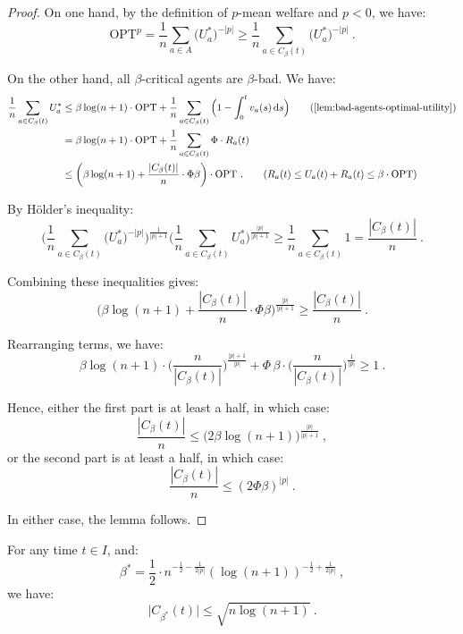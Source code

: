 \documentclass[11pt,letterpaper]{article}
\newcommand{\OPT}{\mathrm{OPT}}
\newcommand{\dif}[1]{\,\text{\rm d} #1}
\newcommand{\utility}{U}
\newcommand{\regularizer}{R}
\begin{document}
\begin{proof}    
	On one hand, by the definition of $p$-mean welfare and $p < 0$, we have:
	\[
		\OPT^p = \frac{1}{n} \sum_{a\in A} \big(\utility_a^*\big)^{-|p|} \ge \frac{1}{n} \sum_{a \in C_\beta(t)} \big(\utility_a^*\big)^{-|p|}
		~.
	\]
	
	On the other hand, all $\beta$-critical agents are $\beta$-bad.
	We have:
	\begin{align*}
		\frac{1}{n} \sum_{a \in C_\beta(t)} \utility_a^*
		&
		\leq \beta \log (n+1) \cdot \OPT + \frac{1}{n} \sum_{a \in C_\beta(t)} \Big( 1 - \int_0^t v_a(s) \dif{s} \Big)
		\tag{\Cref{lem:bad-agents-optimal-utility}} \\
		&
		= \beta \log (n+1) \cdot \OPT + \frac{1}{n} \sum_{a \in C_\beta(t)} \Phi \cdot \regularizer_a(t) \\
		&
		\le \bigg(\beta \log (n+1) + \frac{|C_\beta(t)|}{n} \cdot \Phi \beta \bigg) \cdot \OPT
		~.
		\tag{$\regularizer_a(t) \le \utility_a(t) + \regularizer_a(t) \le \beta \cdot \OPT$}
	\end{align*}
	
	By H\"{o}lder's inequality:
	\[
		\bigg( \frac{1}{n} \sum_{a \in C_\beta(t)} \big(\utility_a^*\big)^{-|p|} \bigg)^{\frac{1}{|p|+1}} \bigg( \frac{1}{n} \sum_{a \in C_\beta(t)} \utility_a^* \bigg)^{\frac{|p|}{|p|+1}} \ge \frac{1}{n} \sum_{a \in C_\beta(t)} 1 = \frac{|C_\beta(t)|}{n}
		~.
	\]
	
	Combining these inequalities gives:
	\[
		\bigg( \beta \log (n+1) + \frac{|C_\beta(t)|}{n} \cdot \Phi \beta \bigg)^{\frac{|p|}{|p|+1}} \ge \frac{|C_\beta(t)|}{n}
		~.
	\]
	
	Rearranging terms, we have:
	\[
		\beta \log (n+1) \cdot \bigg( \frac{n}{|C_\beta(t)|} \bigg)^{\frac{|p|+1}{|p|}} + \Phi\, \beta \cdot \bigg( \frac{n}{|C_\beta(t)|} \bigg)^{\frac{1}{|p|}} \ge 1
		~.
	\]
	
	Hence, either the first part is at least a half, in which case:
	\[
		\frac{|C_\beta(t)|}{n} \le \big(2 \beta \log(n+1) \big)^{\frac{|p|}{|p|+1}}
		~,
	\]
	or the second part is at least a half, in which case:
	\[
		\frac{|C_\beta(t)|}{n} \le (2\Phi\beta)^{|p|}
		~.
	\]
	
	In either case, the lemma follows.
\end{proof}


\begin{corollary}
	\label{cor:critical-threshold}
	For any time $t \in I$, and:
	\begin{equation}
		\label{eq:beta-star}
		\beta^* = \frac{1}{2} \cdot  n^{-\frac{1}{2}-\frac{1}{2|p|}} (\log (n+1))^{-\frac{1}{2}+\frac{1}{2|p|}}
		~,	
	\end{equation}
	we have:
	\[
		\big|C_{\beta^*} (t)\big| \le \sqrt{n \log (n+1)}
		~.
	\]
\end{corollary}
\end{document}
